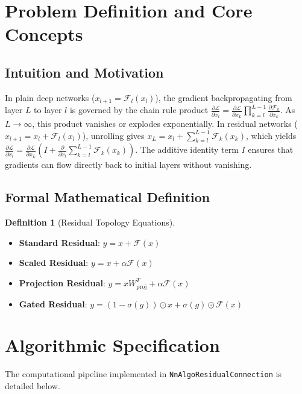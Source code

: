 \documentclass[11pt,a4paper]{article}
\theoremstyle{definition}
\newtheorem{definition}{Definition}[section]
\begin{document}
\section{Problem Definition and Core Concepts}

\subsection{Intuition and Motivation}
In plain deep networks ($x_{l+1} = \mathcal{F}_l(x_l)$), the gradient backpropagating from layer $L$ to layer $l$ is governed by the chain rule product $\frac{\partial \mathcal{L}}{\partial x_l} = \frac{\partial \mathcal{L}}{\partial x_L} \prod_{k=l}^{L-1} \frac{\partial \mathcal{F}_k}{\partial x_k}$. As $L \to \infty$, this product vanishes or explodes exponentially. In residual networks ($x_{l+1} = x_l + \mathcal{F}_l(x_l)$), unrolling gives $x_L = x_l + \sum_{k=l}^{L-1} \mathcal{F}_k(x_k)$, which yields $\frac{\partial \mathcal{L}}{\partial x_l} = \frac{\partial \mathcal{L}}{\partial x_L} \left( I + \frac{\partial}{\partial x_l} \sum_{k=l}^{L-1} \mathcal{F}_k(x_k) \right)$. The additive identity term $I$ ensures that gradients can flow directly back to initial layers without vanishing.

\subsection{Formal Mathematical Definition}
\begin{definition}[Residual Topology Equations]
\begin{itemize}
    \item \textbf{Standard Residual}: $y = x + \mathcal{F}(x)$
    \item \textbf{Scaled Residual}: $y = x + \alpha \mathcal{F}(x)$
    \item \textbf{Projection Residual}: $y = x W_{\text{proj}}^T + \alpha \mathcal{F}(x)$
    \item \textbf{Gated Residual}: $y = (1 - \sigma(g)) \odot x + \sigma(g) \odot \mathcal{F}(x)$
\end{itemize}
\end{definition}

\section{Algorithmic Specification}

The computational pipeline implemented in \texttt{NnAlgoResidualConnection} is detailed below.
\end{document}
